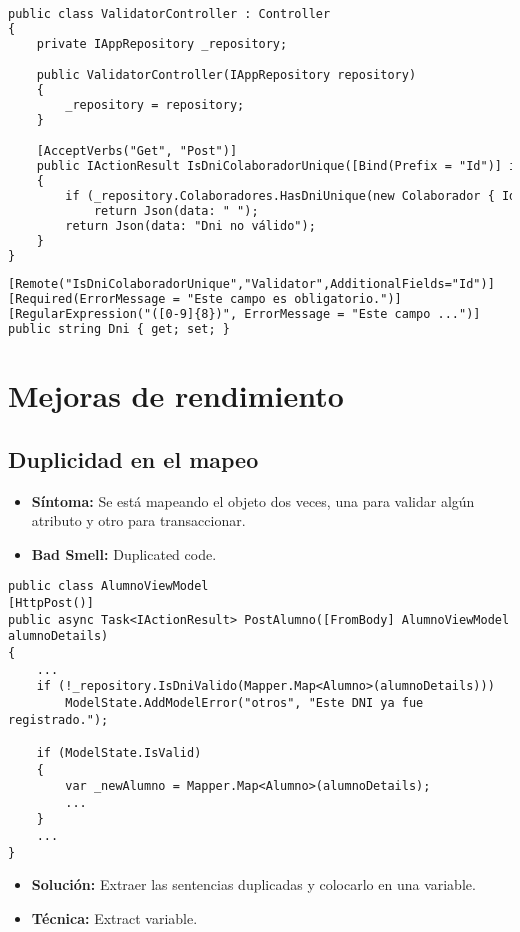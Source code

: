 \begin{lstlisting}[language=html]
public class ValidatorController : Controller
{
	private IAppRepository _repository;

	public ValidatorController(IAppRepository repository)
	{
		_repository = repository;
	}

	[AcceptVerbs("Get", "Post")]
	public IActionResult IsDniColaboradorUnique([Bind(Prefix = "Id")] int id, string dni)
	{
		if (_repository.Colaboradores.HasDniUnique(new Colaborador { Id = id, Dni = dni}))
			return Json(data: " ");
		return Json(data: "Dni no válido");
	}
}
\end{lstlisting}

\begin{lstlisting}[language=html]
[Remote("IsDniColaboradorUnique","Validator",AdditionalFields="Id")]
[Required(ErrorMessage = "Este campo es obligatorio.")]
[RegularExpression("([0-9]{8})", ErrorMessage = "Este campo ...")]
public string Dni { get; set; }
\end{lstlisting}



\section{Mejoras de rendimiento}

\subsection{Duplicidad en el mapeo}
\begin{itemize}
	\item \textbf{Síntoma:} Se está mapeando el objeto dos veces, una para validar algún atributo y otro para transaccionar.
	\item \textbf{Bad Smell:} Duplicated code.
\end{itemize}

\begin{lstlisting}[language={[Sharp]C}]
public class AlumnoViewModel
[HttpPost()]
public async Task<IActionResult> PostAlumno([FromBody] AlumnoViewModel alumnoDetails)
{
	...
	if (!_repository.IsDniValido(Mapper.Map<Alumno>(alumnoDetails)))
		ModelState.AddModelError("otros", "Este DNI ya fue registrado.");

	if (ModelState.IsValid)
	{
		var _newAlumno = Mapper.Map<Alumno>(alumnoDetails);
		...
	}
	...
}
\end{lstlisting}

\begin{itemize}	
	\item \textbf{Solución:} Extraer las sentencias duplicadas y colocarlo en una variable.
	\item \textbf{Técnica:} Extract variable.
\end{itemize}
	
